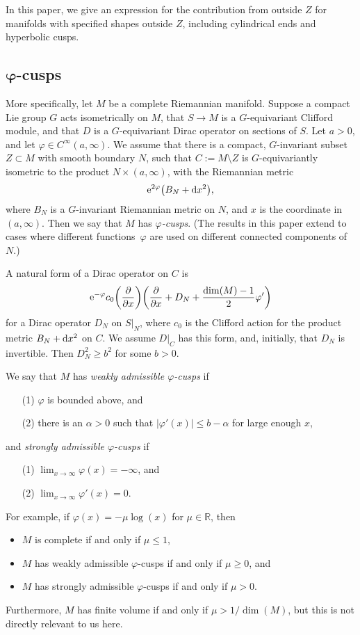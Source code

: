 \documentclass[pdftex]{sigma}%
\numberwithin{equation}{section}
\newcommand{\R}{\mathbb{R}}
\begin{document}
In this paper, we give an expression for the contribution from outside $Z$ for manifolds with specified shapes outside $Z$, including cylindrical ends and hyperbolic cusps.

\subsection*{$\boldsymbol\varphi$-cusps}

More specifically, let $M$ be a complete Riemannian manifold. Suppose a compact Lie group $G$ acts isometrically on $M$, that $S \to M$ is a $G$-equivariant Clifford module, and that $D$ is a $G$-equivariant Dirac operator on sections of $S$.
Let $a>0$, and let $\varphi \in C^{\infty}(a, \infty)$. We assume that there is a compact, $G$-invariant subset $Z \subset M$ with smooth boundary $N$, such that $C := M \setminus Z$ is $G$-equivariantly isometric to the product $N \times (a, \infty)$, with the Riemannian metric
\begin{equation*} %
{\rm e}^{2\varphi}\big(B_N + {\rm d}x^2\big),
\end{equation*}
where $B_N$ is a $G$-invariant Riemannian metric on $N$, and $x$ is the coordinate in $(a, \infty)$. Then we say that $M$ has \emph{$\varphi$-cusps}. (The results in this paper extend to cases where different functions~$\varphi$ are used on different connected components of $N$.)

A natural form of a Dirac operator on $C$ is
\[
{\rm e}^{-\varphi} c_0\bigg(\frac{\partial}{\partial x} \bigg)\bigg(\frac{\partial}{\partial x}+D_N +\frac{\dim(M)-1}{2}\varphi' \bigg)
\]
for a Dirac operator $D_N$ on $S|_N$, where $c_0$ is the Clifford action for the product metric
$B_N + {\rm d}x^2$ on $C$. We assume $D|_C$ has this form, and, initially, that $D_N$ is invertible. Then $D_N^2 \geq b^2$ for some $b>0$.

We say that $M$ has
\emph{weakly admissible $\varphi$-cusps} if
\begin{enumerate}\itemsep=0pt
\item[(1)] $\varphi$ is bounded above, and
\item[(2)] there is an $\alpha>0$ such that $|\varphi'(x)| \leq b - \alpha$ for large enough $x$,
\end{enumerate}
and
\emph{strongly admissible $\varphi$-cusps} if
\begin{enumerate}\itemsep=0pt
\item[(1)] $\lim_{x \to \infty} \varphi(x) =-\infty$, and
\item[(2)] $\lim_{x \to \infty} \varphi'(x) =0$.
\end{enumerate}
For example, if $\varphi(x) = -\mu \log(x)$ for $\mu \in \R$, then
\begin{itemize}\itemsep=0pt
\item $M$ is complete if and only if $\mu \leq 1$,
\item $M$ has weakly admissible $\varphi$-cusps if and only if $\mu \geq 0$, and
\item $M$ has strongly admissible $\varphi$-cusps if and only if $\mu > 0$.
\end{itemize}
Furthermore, $M$ has finite volume if and only if $\mu>1/\dim(M)$, but this is not directly relevant to us here.
\end{document}
